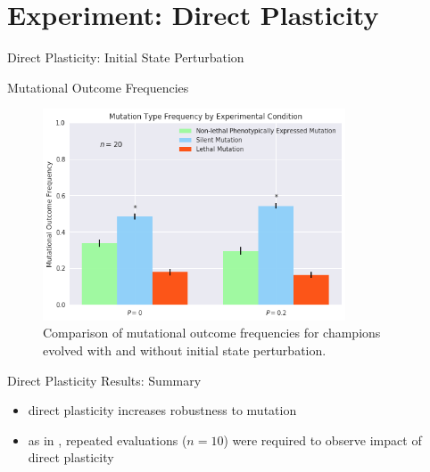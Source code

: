\section{Experiment: Direct Plasticity}


\begin{frame}{Direct Plasticity: Initial State Perturbation}

\end{frame}

\begin{frame}{Mutational Outcome Frequencies}
\begin{figure}
    \centering
    \includegraphics[width=0.8\textwidth]{img/mutation_type_direct}
 	\captionsetup{singlelinecheck=off,justification=raggedright}
  	\caption{Comparison of mutational outcome frequencies for champions evolved with and without initial state perturbation.}
    \label{fig:mutation_type_indirect}
\end{figure}
\end{frame}

\begin{frame}{Direct Plasticity Results: Summary}
\begin{itemize}
  \item direct plasticity increases robustness to mutation
  \item as in \cite{Reisinger2005TowardsEvolvability}, repeated evaluations ($n=10$) were required to observe impact of direct plasticity
\end{itemize}
\end{frame}